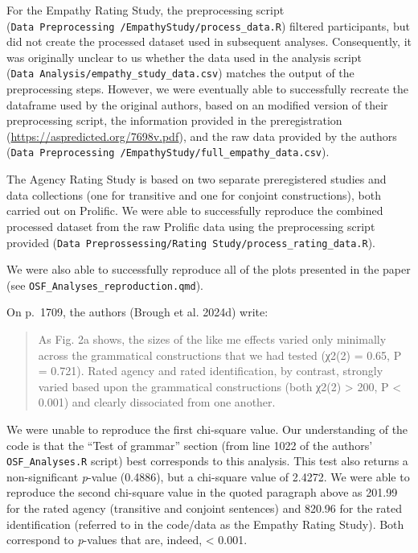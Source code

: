\documentclass[
  letterpaper,
  DIV=11,
  numbers=noendperiod]{scrartcl}
\begin{document}
For the Empathy Rating Study, the preprocessing script
(\texttt{Data\ Preprocessing\ /EmpathyStudy/process\_data.R}) filtered
participants, but did not create the processed dataset used in
subsequent analyses. Consequently, it was originally unclear to us
whether the data used in the analysis script
(\texttt{Data\ Analysis/empathy\_study\_data.csv}) matches the output of
the preprocessing steps. However, we were eventually able to
successfully recreate the dataframe used by the original authors, based
on an modified version of their preprocessing script, the information
provided in the preregistration
(\url{https://aspredicted.org/7698v.pdf}), and the raw data provided by
the authors
(\texttt{Data\ Preprocessing\ /EmpathyStudy/full\_empathy\_data.csv}).

The Agency Rating Study is based on two separate preregistered studies
and data collections (one for transitive and one for conjoint
constructions), both carried out on Prolific. We were able to
successfully reproduce the combined processed dataset from the raw
Prolific data using the preprocessing script provided
(\texttt{Data\ Preprossessing/Rating\ Study/process\_rating\_data.R}).~

We were also able to successfully reproduce all of the plots presented
in the paper (see \texttt{OSF\_Analyses\_reproduction.qmd}).

On p.~1709, the authors (Brough et al. 2024d) write:

\begin{quote}
As Fig. 2a shows, the sizes of the like me effects varied only minimally
across the grammatical constructions that we had tested (χ2(2) = 0.65, P
= 0.721). Rated agency and rated identification, by contrast, strongly
varied based upon the grammatical constructions (both χ2(2)
\textgreater{} 200, P \textless{} 0.001) and clearly dissociated from
one another.
\end{quote}

We were unable to reproduce the first chi-square value. Our
understanding of the code is that the ``Test of grammar'' section (from
line 1022 of the authors' \texttt{OSF\_Analyses.R} script) best
corresponds to this analysis. This test also returns a non-significant
\emph{p}-value (0.4886), but a chi-square value of 2.4272. We were able
to reproduce the second chi-square value in the quoted paragraph above
as 201.99 for the rated agency (transitive and conjoint sentences) and
820.96 for the rated identification (referred to in the code/data as the
Empathy Rating Study). Both correspond to \emph{p}-values that are,
indeed, \textless{} 0.001.
\end{document}
